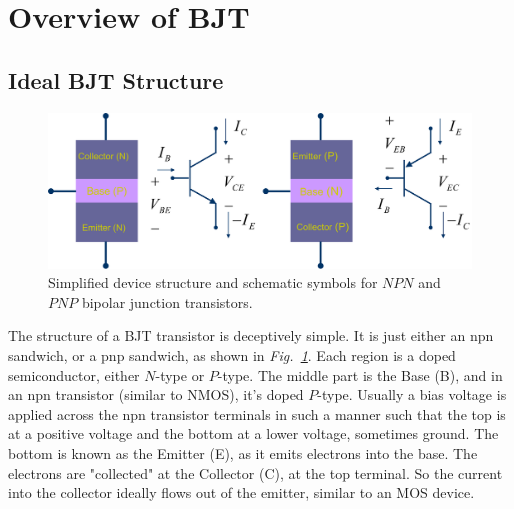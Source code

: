 \section{Overview of BJT}
\subsection{Ideal BJT Structure}
\begin{figure}[tb]
\centering
\includegraphics[width=.85\columnwidth]{slide2_bjt_overview}
\caption{Simplified device structure and schematic symbols for $NPN$ and $PNP$ bipolar junction transistors.}
\label{fig:slide2_bjt_overview}
\end{figure}
The structure of a BJT transistor is deceptively simple.  It is just either an npn sandwich, or a pnp sandwich, as shown in \emph{Fig.~\ref{fig:slide2_bjt_overview}}.  Each region is a doped semiconductor, either $N$-type or $P$-type.  The middle part is the Base (B), and in an npn transistor (similar to NMOS), it's doped $P$-type.  Usually a bias voltage is applied across the npn transistor terminals in such a manner such that the top is at a positive voltage and the bottom at a lower voltage, sometimes ground.  The bottom is known as the Emitter (E), as it emits electrons into the base.  The electrons are "collected" at the Collector (C), at the top terminal.  So the current into the collector ideally flows out of the emitter, similar to an MOS device.

